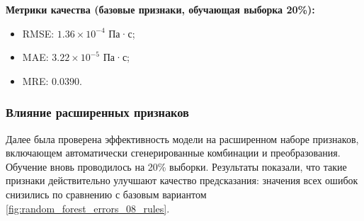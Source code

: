 \documentclass[a4paper,12pt]{article}
\begin{document}
    \vspace{5mm}
    \begin{minipage}{\textwidth}
    \textbf{Метрики качества (базовые признаки, обучающая выборка 20\%):}
      \begin{itemize}
          \item RMSE: \( 1.36 \times 10^{-4} \) Па·с;
          \item MAE: \( 3.22 \times 10^{-5} \) Па·с;
          \item MRE: \( 0.0390 \).
      \end{itemize}
    \end{minipage}
    
    \subsubsection{Влияние расширенных признаков}
    
    Далее была проверена эффективность модели на расширенном наборе признаков, включающем автоматически сгенерированные комбинации и преобразования. Обучение вновь проводилось на 20\% выборки. Результаты показали, что такие признаки действительно улучшают качество предсказания: значения всех ошибок снизились по сравнению с базовым вариантом \autoref{fig:random_forest_errors_08_rules}.
    
\end{document}
